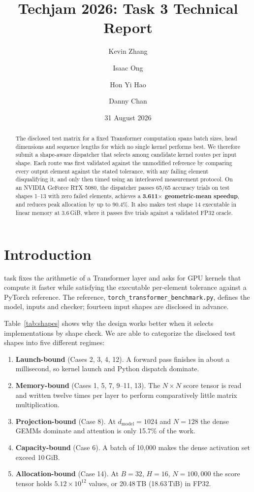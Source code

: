 \documentclass[10pt,conference,compsoc]{IEEEtran}
\begin{document}
\title{Techjam 2026: Task 3 Technical Report}
\author{Kevin Zhang}
\author{Isaac Ong}
\author{Hon Yi Hao}
\author{Danny Chan}
\date{31 August 2026}
\maketitle

\begin{abstract}
The disclosed test matrix for a fixed Transformer computation spans batch sizes, head dimensions and sequence lengths for which no single kernel performs best. We therefore submit a shape-aware dispatcher that selects among candidate kernel routes per input shape. Each route was first validated against the unmodified reference by comparing every output element against the stated tolerance, with any failing element disqualifying it, and only then timed using an interleaved measurement protocol. On an NVIDIA GeForce RTX 5080, the dispatcher passes 65/65 accuracy trials on test shapes 1--13 with zero failed elements, achieves a \textbf{3.611$\times$ geometric-mean speedup}, and reduces peak allocation by up to 90.4\%. It also makes test shape 14 executable in linear memory at 3.6\,GiB, where it passes five trials against a validated FP32 oracle.
\end{abstract}

\section{Introduction}
 task fixes the arithmetic of a Transformer layer and asks for GPU kernels that compute it faster while satisfying the executable per-element tolerance against a PyTorch reference. The reference, \texttt{torch\_transformer\_benchmark.py}, defines the model, inputs and checker; fourteen input shapes are disclosed in advance.

Table~\ref{tab:shapes} shows why the design works better when it selects implementations by shape check. We are able to categorize the disclosed test shapes into five different regimes:

\begin{enumerate}
    \item \textbf{Launch-bound} (Cases 2, 3, 4, 12). A forward pass finishes in about a millisecond, so kernel launch and Python dispatch dominate.
    \item \textbf{Memory-bound} (Cases 1, 5, 7, 9--11, 13). The $N \times N$ score tensor is read and written twelve times per layer to perform comparatively little matrix multiplication.
    \item \textbf{Projection-bound} (Case 8). At $d_\text{model}=1024$ and $N=128$ the dense GEMMs dominate and attention is only 15.7\% of the work.
    \item \textbf{Capacity-bound} (Case 6). A batch of 10{,}000 makes the dense activation set exceed 10\,GiB.
    \item \textbf{Allocation-bound} (Case 14). At $B{=}32$, $H{=}16$, $N{=}100{,}000$ the score tensor holds $5.12 \times 10^{12}$ values, or 20.48\,TB (18.63\,TiB) in FP32.
\end{enumerate}
\end{document}
